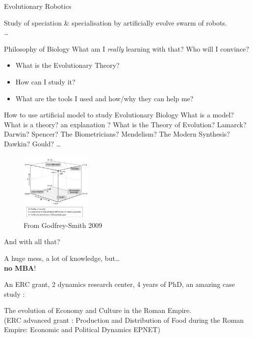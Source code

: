 \documentclass[8pt, handout=show,notes=show]{beamer}
\begin{document}
\begin{frame}{Evolutionary Robotics}

	\begin{center}
		\huge Study of speciation \& specialisation by artificially evolve swarm of robots.\\

		\dots
	\end{center}

	
\end{frame}

\begin{frame}{Philosophy of Biology}
	What am I \emph{really} learning with that? Who will I convince?
    \begin{itemize}
	\item What is the Evolutionary Theory?
	\item How can I study it?
	\item What are the tools I used and how/why they can help me?
    \end{itemize}
    \vfill
    
    \begin{block}{How to use artificial model to study Evolutionary Biology}
	 What is a model? What is a theory? an explanation ? What is the Theory of Evolution? Lamarck? Darwin? Spencer? The Biometricians? Mendelism? The Modern Synthesis? Dawkin? Gould? \ldots 
    \end{block}

    \begin{figure}
	\includegraphics[width=3.5cm]{images/darwinianspace.png}
	\caption{From Godfrey-Smith 2009}
    \end{figure}

    
\end{frame}


\begin{frame}{And with all that?}

    \begin{center}
	\huge
	A huge mess, a lot of knowledge, but\ldots\\  \textbf{no MBA}!
    \end{center}


    
\end{frame}
\begin{frame}
    An ERC grant, 2 dynamics research center, 4 years of PhD, an amazing case study :
    \vfill

    \begin{center}
	\huge
	The evolution of Economy and Culture in the Roman Empire.\\
	\vfill
	\small
	(ERC advanced grant : Production and Distribution of Food during the Roman Empire: Economic and Political Dynamics EPNET)
    \end{center}
\end{frame}
\end{document}
